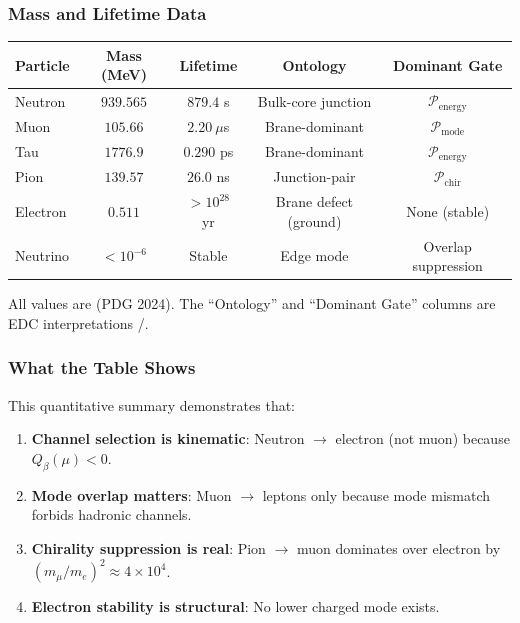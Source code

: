 \subsubsection{Mass and Lifetime Data}

\begin{center}
\begin{tabular}{lcccc}
\toprule
\textbf{Particle} & \textbf{Mass (MeV)} & \textbf{Lifetime} &
\textbf{Ontology} & \textbf{Dominant Gate} \\
\midrule
Neutron & $939.565$ & $879.4$ s & Bulk-core junction &
$\mathcal{P}_{\text{energy}}$ \\
Muon & $105.66$ & $2.20~\mu$s & Brane-dominant &
$\mathcal{P}_{\text{mode}}$ \\
Tau & $1776.9$ & $0.290$ ps & Brane-dominant &
$\mathcal{P}_{\text{energy}}$ \\
Pion & $139.57$ & $26.0$ ns & Junction-pair &
$\mathcal{P}_{\text{chir}}$ \\
Electron & $0.511$ & $> 10^{28}$ yr & Brane defect (ground) &
None (stable) \\
Neutrino & $< 10^{-6}$ & Stable & Edge mode &
Overlap suppression \\
\bottomrule
\end{tabular}
\end{center}

All values are \tagBL{} (PDG 2024). The ``Ontology'' and ``Dominant Gate'' columns
are EDC interpretations \tagP{}/\tagDc{}.

\subsubsection{What the Table Shows}

This quantitative summary demonstrates that:
\begin{enumerate}[nosep]
  \item \textbf{Channel selection is kinematic}: Neutron $\to$ electron (not muon)
        because $Q_\beta(\mu) < 0$.
  \item \textbf{Mode overlap matters}: Muon $\to$ leptons only because mode mismatch
        forbids hadronic channels.
  \item \textbf{Chirality suppression is real}: Pion $\to$ muon dominates over
        electron by $(m_\mu/m_e)^2 \approx 4 \times 10^4$.
  \item \textbf{Electron stability is structural}: No lower charged mode exists.
\end{enumerate}


